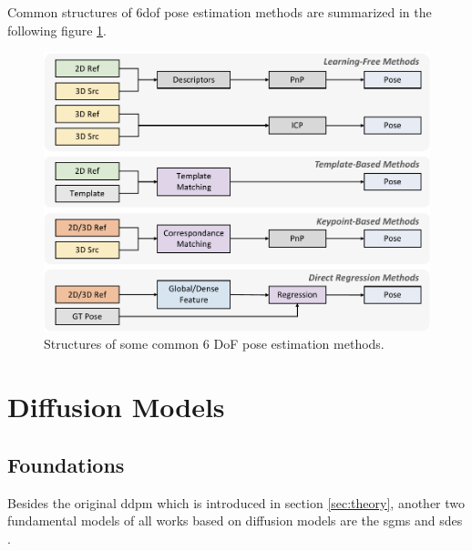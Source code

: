 \documentclass[12pt,DIV14,BCOR12mm,a4paper,footinclude=false,headinclude,parskip=half-,twoside,openright,cleardoublepage=empty,toc=index,bibliography=totoc,listof=totoc]{scrreprt}
\numberwithin{equation}{chapter}
\begin{document}
Common structures of \gls{6dof} pose estimation methods are summarized in the following figure \ref{img:pose_methods}.
\begin{figure}[h]
	\centering
	\includegraphics[width=1.\textwidth]{img/pose_methods.pdf}
	\caption{Structures of some common 6 DoF pose estimation methods.}
	\label{img:pose_methods}
\end{figure}

\section{Diffusion Models}
\subsection{Foundations}
Besides the original \gls{ddpm} \cite{sohldickstein2015deep,ho2020denoising} which is introduced in section \ref{sec:theory}, another two fundamental models of all works based on diffusion models are the \glspl{sgm} \cite{song2020generative,song2020improved} and \glspl{sde} \cite{song2021maximum,song2021scorebased}.
\end{document}
